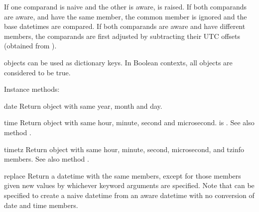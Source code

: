 \begin{description}
If one comparand is naive and
the other is aware,  is raised.  If both
    comparands are aware, and have the same  member,
    the common  member is ignored and the base datetimes
    are compared.  If both comparands are aware and have different
     members, the comparands are first adjusted by
    subtracting their UTC offsets (obtained from ).

\end{description}

 objects can be used as dictionary keys. In Boolean
contexts, all  objects are considered to be true.


Instance methods:

\begin{methoddesc}{date}{}
  Return  object with same year, month and day.
\end{methoddesc}

\begin{methoddesc}{time}{}
  Return  object with same hour, minute, second and microsecond.
   is .  See also method .
\end{methoddesc}

\begin{methoddesc}{timetz}{}
  Return  object with same hour, minute, second, microsecond,
  and tzinfo members.  See also method .
\end{methoddesc}

\begin{methoddesc}{replace}{}
  Return a datetime with the same members, except for those members given
  new values by whichever keyword arguments are specified.  Note that
   can be specified to create a naive datetime from
  an aware datetime with no conversion of date and time members.
\end{methoddesc}


